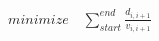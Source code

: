 \documentclass[preview]{standalone}
\begin{document}
\begin{align*}
minimize \quad  \sum_{start}^{end} \frac{d_{i,i+1}}{v_{i,i+1}}
\end{align*}
\end{document}
